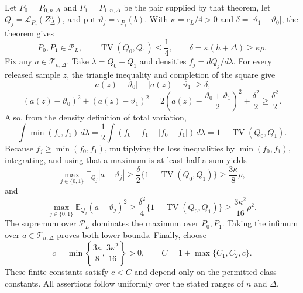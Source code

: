 Let \(P_0=P_{0,n,\Delta}\) and \(P_1=P_{1,n,\Delta}\) be the pair supplied by that theorem, let \(Q_j=\mathcal L_{P_j}(Z_\Delta^n)\), and put \(\vartheta_j=\tau_{P_j}(b)\).  With \(\kappa=c_L/4>0\) and \(\delta=|\vartheta_1-\vartheta_0|\), the theorem gives
\[
 P_0,P_1\in\mathcal P_L,
 \qquad
 \operatorname{TV}(Q_0,Q_1)\leq\frac14,
 \qquad
 \delta=\kappa(h+\Delta)\geq\kappa\rho.
\]
Fix any \(a\in\mathcal T_{n,\Delta}\).  Take \(\lambda=Q_0+Q_1\) and densities \(f_j=dQ_j/d\lambda\).  For every released sample \(z\), the triangle inequality and completion of the square give
\[
 |a(z)-\vartheta_0|+|a(z)-\vartheta_1|\geq\delta,
\]
\[
 (a(z)-\vartheta_0)^2+(a(z)-\vartheta_1)^2
 =2\left(a(z)-\frac{\vartheta_0+\vartheta_1}{2}\right)^2+\frac{\delta^2}{2}
 \geq\frac{\delta^2}{2}.
\]
Also, from the density definition of total variation,
\[
 \int\min(f_0,f_1)\,d\lambda
 =\frac12\int(f_0+f_1-|f_0-f_1|)\,d\lambda
 =1-\operatorname{TV}(Q_0,Q_1).
\]
Because \(f_j\geq\min(f_0,f_1)\), multiplying the loss inequalities by \(\min(f_0,f_1)\), integrating, and using that a maximum is at least half a sum yields
\[
 \max_{j\in\{0,1\}}\mathbb E_{Q_j}|a-\vartheta_j|
 \geq\frac\delta2\{1-\operatorname{TV}(Q_0,Q_1)\}
 \geq\frac{3\kappa}{8}\rho,
\]
and
\[
 \max_{j\in\{0,1\}}\mathbb E_{Q_j}(a-\vartheta_j)^2
 \geq\frac{\delta^2}{4}\{1-\operatorname{TV}(Q_0,Q_1)\}
 \geq\frac{3\kappa^2}{16}\rho^2.
\]
The supremum over \(\mathcal P_L\) dominates the maximum over \(P_0,P_1\).  Taking the infimum over \(a\in\mathcal T_{n,\Delta}\) proves both lower bounds.  Finally, choose
\[
 c=\min\left\{\frac{3\kappa}{8},\frac{3\kappa^2}{16}\right\}>0,
 \qquad
 C=1+\max\{C_1,C_2,c\}.
\]
These finite constants satisfy \(c<C\) and depend only on the permitted class constants.  All assertions follow uniformly over the stated ranges of \(n\) and \(\Delta\).